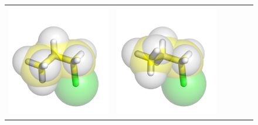 \documentclass{svmult}
\begin{document}
\begin{figure}
\begin{tabular}{cccccc}
\includegraphics[width=\tmpa]{fig/m003-001} &
\includegraphics[width=\tmpa]{fig/m003-002} & 

\end{tabular}
\end{figure}
\end{document}
